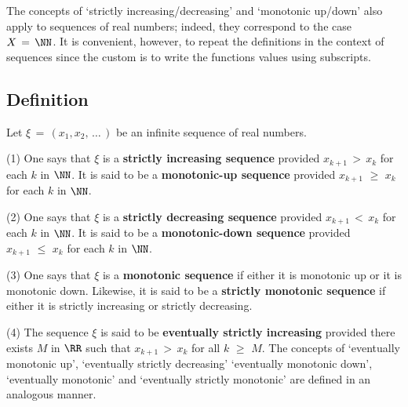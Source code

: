 \V
\V


      The concepts of `strictly increasing/decreasing' and `monotonic up/down' also apply to sequences of real numbers;
    indeed, they correspond to the case $X \,=\, {\NN}$.
    It is convenient, however, to repeat the definitions in the context of sequences since the custom is to write the functions values using subscripts.

\V

            \subsection{\small{\bf Definition}}
            \label{DefB20.180}

\V

        Let ${\xi} \,=\, (x_{1},x_{2},\,{\ldots}\,)$ be an infinite sequence of real numbers.

\V

        (1) One says that ${\xi}$ is a {\bf strictly increasing sequence} provided $x_{k+1}\,>\,x_{k}$ for each $k$ in ${\NN}$.
    It is said to be a {\bf monotonic-up sequence} provided $x_{k+1}\,\,{\geq}\,\,x_{k}$ for each $k$ in ${\NN}$.

\V

        (2) One says that ${\xi}$ is a {\bf strictly decreasing sequence} provided $x_{k+1}\,<\,x_{k}$ for each $k$ in ${\NN}$.
    It is said to be a {\bf monotonic-down sequence} provided $x_{k+1}\,\,{\leq}\,\,x_{k}$ for each $k$ in ${\NN}$.

\V

        (3) One says that ${\xi}$ is a {\bf monotonic sequence} if either it is monotonic up or it is monotonic down.
    Likewise, it is said to be a {\bf strictly monotonic sequence} if either it is strictly increasing or strictly decreasing.

\V

        (4) The sequence ${\xi}$ is said to be {\bf eventually strictly increasing} provided there exists $M$ in ${\RR}$ such that $x_{k+1}\,>\,x_{k}$ for all $k\,\,{\geq}\,\,M$.
    The concepts of `eventually monotonic up', `eventually strictly decreasing' `eventually monotonic down', `eventually monotonic' and `eventually strictly monotonic' are defined in an analogous manner.


\V
\V

